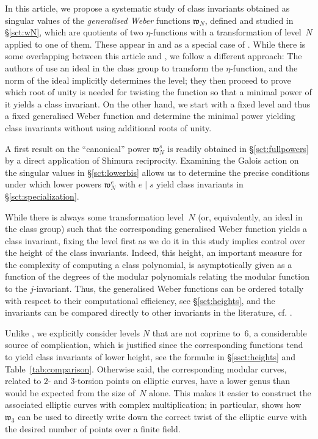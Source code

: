 \documentclass[12pt,twoside,leqno]{article}
\numberwithin{equation}{section}
\newcommand{\w}{\mathfrak w}
\begin{document}
In this article, we propose a systematic study of class invariants obtained
as singular values of the \emph {generalised Weber} functions $\w_N$,
defined and studied in \S\ref {sct:wN}, which are quotients of two
$\eta$-functions with a transformation of level~$N$ applied to one of them.
These appear in \cite [Table~1]{Schertz02} and as a special case
of \cite {HaVi97}. While there is some overlapping between this article
and \cite {HaVi97}, we follow a different approach:
The authors of \cite {HaVi97} use an ideal in the class group
to transform the $\eta$-function, and the norm of the ideal implicitly
determines the level; they then proceed to prove which root of unity
is needed for twisting the function so that a minimal power of it yields
a class invariant. On the other hand, we start with a fixed level and thus
a fixed generalised Weber function and determine the minimal power yielding
class invariants without using additional roots of unity.

A first result on the ``canonical'' power $\w_N^s$ is readily obtained
in \S\ref{sct:fullpowers} by a direct application of Shimura reciprocity.
Examining the Galois action on the singular values in \S\ref {sct:lowerbis}
allows us to determine the precise conditions under which lower powers
$\w_N^e$ with $e \mid s$ yield class invariants in
\S\ref {sct:specialization}.

While there is always some transformation level~$N$ (or, equivalently,
an ideal in the class group) such that the corresponding generalised Weber
function yields a class invariant, fixing the level first as we do it in
this study implies control over the height of the class invariants.
Indeed, this height, an important measure for the complexity
of computing a class polynomial,
is asymptotically given as a function of the degrees of the modular
polynomials relating the modular function to the $j$-invariant. 
Thus, the generalised Weber functions can be ordered totally with respect
to their computational efficiency, see \S\ref{sct:heights}, and the
invariants can be compared directly to other invariants in the literature,
cf. \cite{EnMo02,Enge07}.

Unlike \cite {HaVi97}, we explicitly consider levels $N$ that are
not coprime to~$6$, a considerable source of complication, which is justified
since the corresponding functions tend to yield class invariants of lower
height, see the formul{\ae} in \S\ref {ssct:heights} and
Table~\ref {tab:comparison}. Otherwise said, the corresponding modular
curves, related to $2$- and $3$-torsion points on elliptic curves, have a
lower genus than would be expected from the size of~$N$ alone.
This makes it easier to construct the associated elliptic curves with
complex multiplication; in particular, \cite {Morain07} shows how $\w_3$
can be used to directly write down the correct twist of the elliptic curve
with the desired number of points over a finite field.
\end{document}
